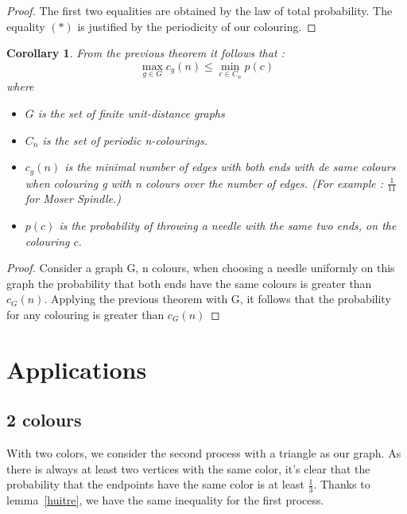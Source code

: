 \documentclass[a4paper,11pt]{article}
\newtheorem{cons}{Corollary}
\theoremstyle{definition}
\theoremstyle{remark}
\begin{document}
\begin{proof}
The first two equalities are obtained by the law of total probability.
The equality $(*)$ is justified by the periodicity of our colouring.
\end{proof}

\begin{cons} \label{ineg}
From the previous theorem it follows that :
$$ \max_{g \in G} c_g(n) \leq \min_{c \in C_n} p(c) $$
where \begin{itemize} 
  \item $G$ is the set of finite unit-distance graphs 
  \item $C_n$ is the set of periodic n-colourings.
  \item $c_g(n)$ is the minimal number of edges with both ends with de
same colours when colouring g with n colours over the number of edges.
(For example : $\frac 1 {11}$ for Moser Spindle.)
  \item $p(c)$ is the probability of throwing a needle with the same two
ends, on the colouring $c$.
\end{itemize}

\end{cons}

\begin{proof}
Consider a graph G, n colours, when choosing a needle
uniformly on this graph the probability that both ends have the same
colours is greater than $c_G(n)$. Applying the previous theorem with G, 
it follows that the probability for any colouring is greater than $c_G(n)$    
\end{proof}

\section{Applications} \label{appli}
\subsection{2 colours}


With two colors, we consider the second process with a triangle as our graph. 
As there is always at least two vertices with the same color, it's clear that 
the probability that the endpoints have the same color is at least 
$\frac{1}{3}$. Thanks to lemma~\ref{huitre}, we have the same inequality for 
the first process.
\end{document}
